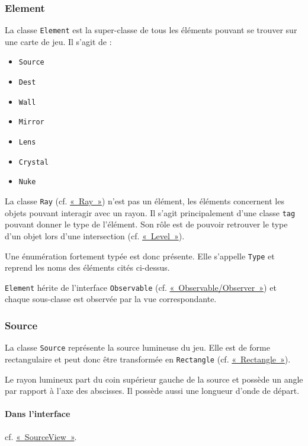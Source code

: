 \documentclass[]{report}
\begin{document}
\subsubsection{\label{Element}Element}

La classe \texttt{Element} est la super-classe de tous les éléments pouvant
se trouver sur une carte de jeu.
Il s'agit de :

\begin{itemize}
    \item \texttt{Source}
    \item \texttt{Dest}
    \item \texttt{Wall}
    \item \texttt{Mirror}
    \item \texttt{Lens}
    \item \texttt{Crystal}
    \item \texttt{Nuke}
\end{itemize}

La classe \texttt{Ray} (cf. \hyperref[Ray]{«~Ray~»}) n’est pas un élément, les éléments concernent 
les objets pouvant interagir avec un rayon.
Il s'agit principalement d'une classe \texttt{tag} pouvant
donner le type de l'élément. Son rôle est de pouvoir retrouver
le type d'un objet lors d'une intersection (cf. \hyperref[Level]{«~Level~»}).

Une énumération fortement typée est donc présente. Elle s'appelle
\texttt{Type} et reprend les noms des éléments cités ci-dessus.

\texttt{Element} hérite de l'interface \texttt{Observable} (cf. \hyperref[OO]{«~Observable/Observer~»}) et chaque
sous-classe est observée par la vue correspondante.
    
\subsubsection{\label{Source}Source}

La classe \texttt{Source} représente la source lumineuse du jeu.
Elle est de forme rectangulaire et peut donc être transformée
en \texttt{Rectangle} (cf. \hyperref[Rectangle]{«~Rectangle~»}).

Le rayon lumineux part du coin supérieur gauche de la source et possède
un angle par rapport à l'axe des abscisses. Il possède aussi une longueur
d'onde de départ.

\paragraph{Dans l'interface} cf. \hyperref[SourceView]{«~SourceView~»}.
\end{document}
